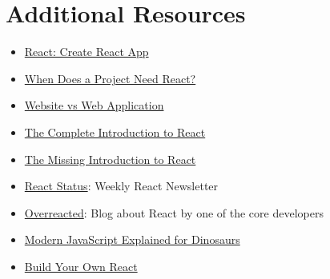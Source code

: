 \section{Additional Resources}

\begin{itemize}[leftmargin=*]
    \item \href{https://reactjs.org/docs/add-react-to-a-new-app.html#create-react-app}{React: Create React App}
    \item \href{https://css-tricks.com/project-need-react/}{When Does a Project Need React?}
    \item \href{https://www.seguetech.com/website-vs-web-application-whats-the-difference/}{Website vs Web Application}
    \item \href{https://jscomplete.com/learn/complete-intro-react}{The Complete Introduction to React}
    \item \href{https://medium.com/javascript-scene/the-missing-introduction-to-react-62837cb2fd76}{The Missing Introduction to React}
    \item \href{http://react.statuscode.com/}{React Status}: Weekly React Newsletter
    \item \href{https://overreacted.io}{Overreacted}: Blog about React by one of the core developers
    \item \href{https://medium.com/the-node-js-collection/modern-javascript-explained-for-dinosaurs-f695e9747b70}{Modern JavaScript Explained for Dinosaurs}
    \item \href{https://pomb.us/build-your-own-react/}{Build Your Own React}
\end{itemize}
